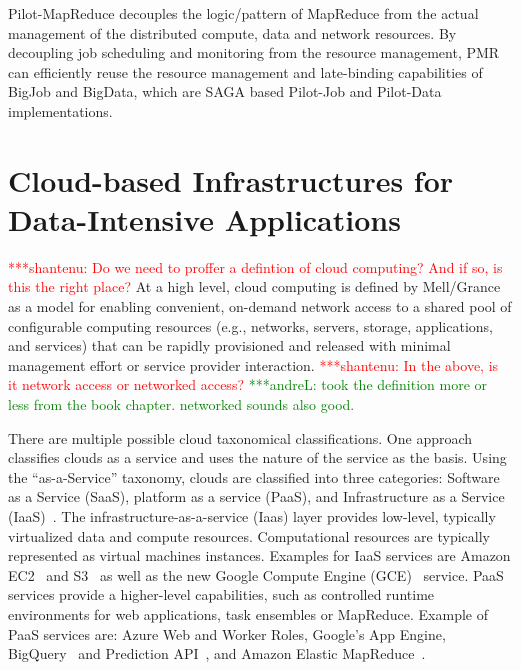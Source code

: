 \documentclass[times]{cpeauth}
\newcommand{\jhanote}[1]{ {\textcolor{red} { ***shantenu: #1 }}}
\newcommand{\alnote}[1]{ {\textcolor{green} { ***andreL: #1 }}}
\newcommand{\alnote}[1]{}
\newcommand{\jhanote}[1]{}
\begin{document}
\begin{itemize}
Pilot-MapReduce decouples the logic/pattern of MapReduce from the actual
management of the distributed compute, data and network resources. By
decoupling job scheduling and monitoring from the resource management, PMR can
efficiently reuse the resource management and late-binding capabilities of
BigJob and BigData, which are SAGA based Pilot-Job and Pilot-Data
implementations.

\end{itemize}


\section{Cloud-based Infrastructures for Data-Intensive Applications}


\jhanote{Do we need to proffer a defintion of cloud computing? And if
  so, is this the right place?} At a high level, cloud computing is
defined by Mell/Grance~\cite{nist_cloud} as a model for enabling
convenient, on-demand network access to a shared pool of configurable
computing resources (e.g., networks, servers, storage, applications,
and services) that can be rapidly provisioned and released with
minimal management effort or service provider interaction.
\jhanote{In the above, is it network access or networked access?}\alnote{took 
the definition more or less from the book chapter. networked sounds also 
good.}


There are multiple possible cloud taxonomical classifications. One
approach classifies clouds as a service and uses the nature of the
service as the basis. Using the ``as-a-Service'' taxonomy, clouds are
classified into three categories: Software as a Service (SaaS),
platform as a service (PaaS), and Infrastructure as a Service
(IaaS)~\cite{Jha:2010kx}. The infrastructure-as-a-service (Iaas) layer
provides low-level, typically virtualized data and compute resources.
Computational resources are typically represented as virtual machines
instances. Examples for IaaS services are Amazon EC2~\cite{amazon_ec2}
and S3~\cite{amazons3} as well as the new Google Compute Engine
(GCE)~\cite{gce} service. PaaS services provide a higher-level
capabilities, such as controlled runtime environments for web
applications, task ensembles or MapReduce.  Example of PaaS services
are: Azure Web and Worker Roles, Google's App Engine,
BigQuery~\cite{google-bigquery} and Prediction
API~\cite{google-predication-api}, and Amazon Elastic
MapReduce~\cite{amazonemr}.
\end{document}
